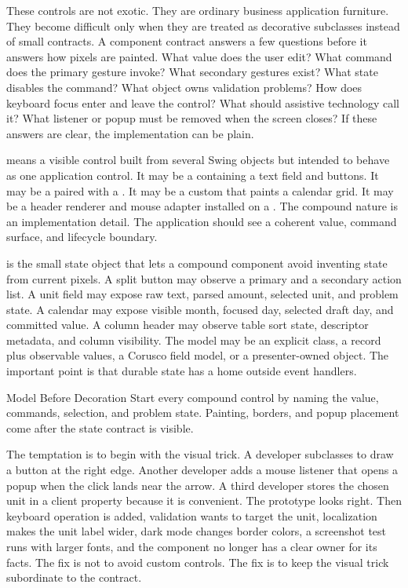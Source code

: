 These controls are not exotic. They are ordinary business application furniture. They
become difficult only when they are treated as decorative subclasses instead of small
contracts. A component contract answers a few questions before it answers how pixels are
painted. What value does the user edit? What command does the primary gesture invoke?
What secondary gestures exist? What state disables the command? What object owns
validation problems? How does keyboard focus enter and leave the control? What should
assistive technology call it? What listener or popup must be removed when the screen
closes? If these answers are clear, the implementation can be plain.

 means a visible control built
from several Swing objects but intended to behave as one application control. It may be
a  containing a text field and buttons. It may be a
 paired with a . It may be a custom
 that paints a calendar grid. It may be a header renderer and
mouse adapter installed on a
. The compound
nature is an implementation detail. The application should see a coherent value, command
surface, and lifecycle boundary.

 is the small state object that lets a
compound component avoid inventing state from current pixels. A split button may observe
a primary  and a secondary action list. A unit field may expose raw text,
parsed amount, selected unit, and problem state. A calendar may expose visible month,
focused day, selected draft day, and committed value. A column header may observe table
sort state, descriptor metadata, and column visibility. The model may be an explicit
class, a record plus observable values, a Corusco field model, or a presenter-owned
object. The important point is that durable state has a home outside event handlers.

\begin{principlebox}{Model Before Decoration}
Start every compound control by naming the value, commands, selection, and problem
state. Painting, borders, and popup placement come after the state contract is visible.
\end{principlebox}

The temptation is to begin with the visual trick. A developer subclasses
 to draw a button at the right edge. Another developer adds a
mouse listener that opens a popup when the click lands near the arrow. A third developer
stores the chosen unit in a client property because it is convenient. The prototype
looks right. Then keyboard operation is added, validation wants to target the unit,
localization makes the unit label wider, dark mode changes border colors, a screenshot
test runs with larger fonts, and the component no longer has a clear owner for its
facts. The fix is not to avoid custom controls. The fix is to keep the visual trick
subordinate to the contract.

